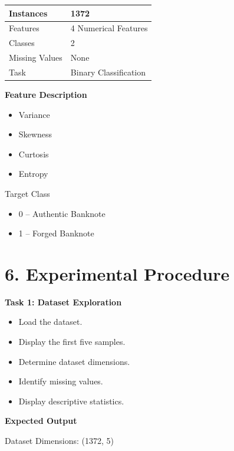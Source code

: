 \documentclass[11pt]{article}
\begin{document}
\begin{center}
\begin{tabular}{|l|l|}
\hline
Instances & 1372\\
\hline
Features & 4 Numerical Features\\
\hline
Classes & 2\\
\hline
Missing Values & None\\
\hline
Task & Binary Classification\\
\hline
\end{tabular}
\end{center}

\textbf{Feature Description}

\begin{itemize}
\item Variance
\item Skewness
\item Curtosis
\item Entropy
\end{itemize}

Target Class

\begin{itemize}
\item 0 -- Authentic Banknote
\item 1 -- Forged Banknote
\end{itemize}


\section*{6. Experimental Procedure}

\textbf{Task 1: Dataset Exploration}

\begin{itemize}
\item Load the dataset.
\item Display the first five samples.
\item Determine dataset dimensions.
\item Identify missing values.
\item Display descriptive statistics.
\end{itemize}

\textbf{Expected Output}

Dataset Dimensions: (1372, 5)
\end{document}
